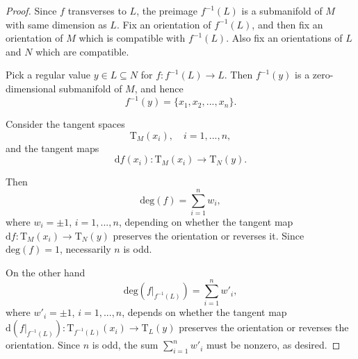\documentclass[10pt,a4paper]{amsart}
\begin{document}
\begin{proof}
Since $f$ transverses to $L$, the preimage $f^{-1}(L)$ is a submanifold of $M$ with same dimension as $L$. Fix an orientation of $f^{-1}(L)$, and then fix an orientation of $M$ which is compatible with $f^{-1}(L)$. Also fix an orientations of $L$ and $N$ which are compatible.

Pick a regular value $y \in L \subseteq N$ for $f: f^{-1}(L) \to L$. Then $f^{-1}(y)$ is a zero-dimensional submanifold of $M$, and hence $$f^{-1}(y) = \{x_1, x_2, ..., x_n\}.$$ 

Consider the tangent spaces $$\mathrm{T}_M(x_i), \quad i=1, ..., n, $$ and the tangent maps
$$\mathrm{d}f(x_i): \mathrm{T}_M(x_i) \to \mathrm{T}_N(y). $$

Then
$$
\mathrm{deg}(f) = \sum_{i=1}^n w_i,
$$
where $w_i = \pm 1$, $i=1, ..., n$, depending on whether the tangent map $\mathrm df: \mathrm{T}_M(x_i) \to \mathrm{T}_N(y)$ preserves the orientation or reverses it. Since $\mathrm{deg}(f) = 1$, necessarily $n$ is odd.

On the other hand
$$
\mathrm{deg}(f|_{f^{-1}(L)}) = \sum_{i=1}^n w'_i,
$$
where $w'_i = \pm 1$, $i=1, ..., n$, depends on whether the tangent map $\mathrm d(f|_{f^{-1}(L)}): \mathrm{T}_{f^{-1}(L)}(x_i) \to \mathrm{T}_L(y)$ preserves the orientation or reverses the orientation. Since $n$ is odd, the sum $\sum_{i=1}^n w'_i$ must be nonzero, as desired.
%
\end{proof}
\end{document}
